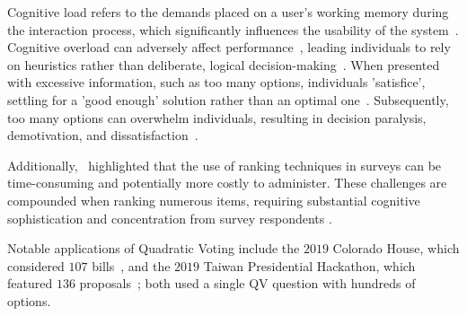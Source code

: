 Cognitive load refers to the demands placed on a user's working memory during the interaction process, which significantly influences the usability of the system~\cite{cooper1998research, seppCognitiveLoadTheory2019}. Cognitive overload can adversely affect performance~\cite{drommi2001interface}, leading individuals to rely on heuristics rather than deliberate, logical decision-making~\cite{daniel2017thinking}. When presented with excessive information, such as too many options, individuals 'satisfice', settling for a 'good enough' solution rather than an optimal one~\cite{simonBehavioralModelRational1955, payneAdaptiveStrategySelection1988, tverskyJudgmentsRepresentativeness}. Subsequently, too many options can overwhelm individuals, resulting in decision paralysis, demotivation, and dissatisfaction~\cite{iyengarWhenChoiceDemotivating2000}.

Additionally,~\textcite{alwinMeasurementValuesSurveys1985} highlighted that the use of ranking techniques in surveys can be time-consuming and potentially more costly to administer. These challenges are compounded when ranking numerous items, requiring substantial cognitive sophistication and concentration from survey respondents \cite{featherMeasurementValuesEffects1973}.

Notable applications of Quadratic Voting include the $2019$ Colorado House, which considered $107$ bills~\cite{coyNewWayVoting2019}, and the $2019$ Taiwan Presidential Hackathon, which featured $136$ proposals~\cite{QuadraticVotingFrontend2022}; both used a single QV question with hundreds of options.~


